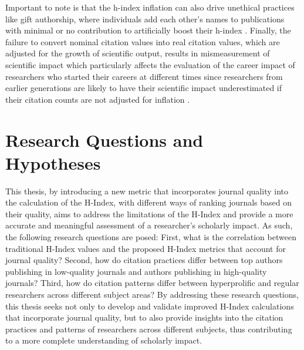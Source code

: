 Important to note is that the h-index inflation can also drive unethical
practices like gift authorship, where individuals add each other’s names to
publications with minimal or no contribution to artificially boost their
h-index \cite{bi2023four}. Finally, the failure to convert nominal citation
values into real citation values, which are adjusted for the growth of
scientific output, results in mismeasurement of scientific impact which
particularly affects the evaluation of the career impact of researchers who
started their careers at different times since researchers from earlier
generations are likely to have their scientific impact underestimated if their
citation counts are not adjusted for inflation \cite{petersen2019methods}.

\section{Research Questions and Hypotheses}
This thesis, by introducing a new metric that incorporates journal quality into
the calculation of the H-Index, with different ways of ranking journals based
on their quality, aims to address the limitations of the H-Index and provide a
more accurate and meaningful assessment of a researcher's scholarly impact. As
such, the following research questions are posed: First, what is the
correlation between traditional H-Index values and the proposed H-Index metrics
that account for journal quality? Second, how do citation practices differ
between top authors publishing in low-quality journals and authors publishing
in high-quality journals? Third, how do citation patterns differ between
hyperprolific and regular researchers across different subject
areas? By addressing these research questions, this thesis seeks not only to
develop and validate improved H-Index calculations that incorporate journal
quality, but to also provide insights into the citation practices and patterns
of researchers across different subjects, thus contributing to a more complete
understanding of scholarly impact.


